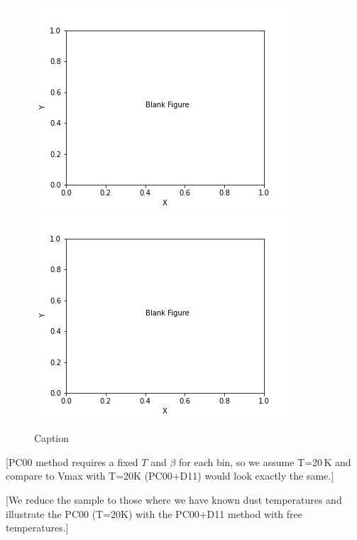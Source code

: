 \begin{figure}
	\centering
	\includegraphics[width=0.75\columnwidth]{Figures/blank_figure.png}
    \includegraphics[width=0.75\columnwidth]{Figures/blank_figure.png}
	\caption{Caption}
	\label{fig:pc00_vmax_t20}
\end{figure}

[PC00 method requires a fixed $T$ and $\beta$ for each bin, so we assume T=20\,K and compare to Vmax with T=20K (PC00+D11) would look exactly the same.]

[We reduce the sample to those where we have known dust temperatures and illustrate the PC00 (T=20K) with the PC00+D11 method with free temperatures.]
